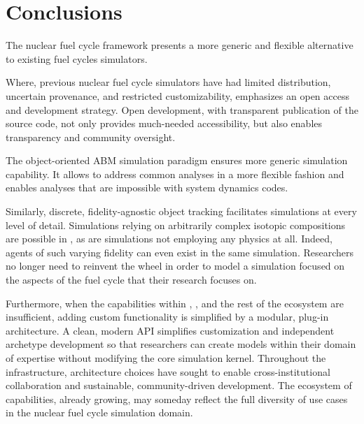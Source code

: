 

\section{Conclusions}


The \Cyclus nuclear fuel cycle framework presents a more generic and flexible 
alternative to existing fuel cycles simulators. 

Where, previous nuclear fuel cycle simulators have had limited distribution, 
uncertain provenance, and restricted customizability, \Cyclus emphasizes an 
open access and development strategy.  Open development, with transparent 
publication of the source code, not only provides much-needed accessibility, 
but also enables transparency and community oversight. 

The object-oriented \acrlong{ABM} simulation paradigm ensures more generic 
simulation capability. It allows \Cyclus to address common analyses in a more 
flexible fashion and enables analyses that are impossible with system dynamics 
codes. 

Similarly, discrete, fidelity-agnostic object tracking facilitates simulations 
at every level of detail. Simulations relying on arbitrarily complex isotopic 
compositions are possible in \Cyclus, as are simulations not employing any 
physics at all. Indeed, agents of such varying fidelity can even exist in the 
same simulation. Researchers no longer need to reinvent the wheel in order to 
model a simulation focused on the aspects of the fuel cycle that their research 
focuses on.

Furthermore, when the capabilities within \Cyclus, \Cycamore, and the rest of 
the ecosystem are insufficient, adding custom functionality is simplified by a 
modular, plug-in architecture. A clean, modern \gls{API} simplifies 
customization and independent archetype development so that researchers can 
create models within their domain of expertise without modifying the core 
simulation kernel. Throughout the \Cyclus 
infrastructure, architecture choices have sought to enable cross-institutional 
collaboration and sustainable, community-driven development. The ecosystem 
of capabilities, already growing, may someday reflect the full diversity of use 
cases in the nuclear fuel cycle simulation domain.


